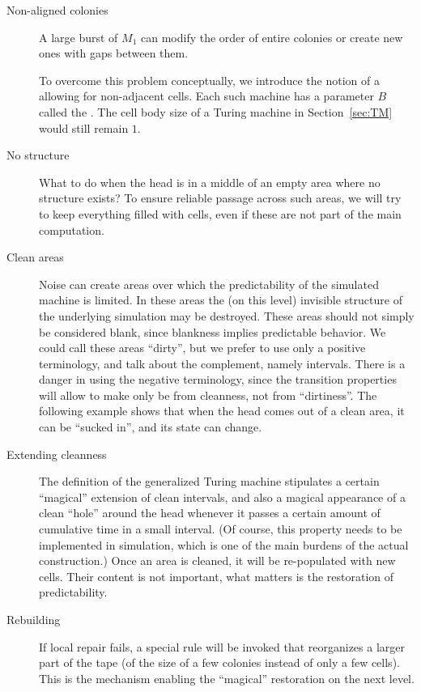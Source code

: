 \documentclass[12pt]{memoir}
\def\B{B}
\begin{document}
\begin{description}

\item[Non-aligned colonies] A large burst of \( M_{1} \) can modify the order of
entire colonies or create new ones with gaps between them.

To overcome this problem conceptually, we 
introduce the notion of a 
allowing for non-adjacent cells.
Each such machine has a parameter \( \B \) called the .
The cell body size of a Turing machine in Section~\ref{sec:TM} would still remain
\( 1 \).

    \item[No structure] What to do when the head is in a middle of an empty area
       where no structure exists?
To ensure reliable passage across such areas,
we will try to keep everything filled with cells, even if these are
not part of the main computation.

\item[Clean areas]
    Noise can create areas over
which the predictability of the simulated machine is limited.
In these areas the (on this level) invisible structure
of the underlying simulation may be destroyed.
These areas should not simply be considered blank, since
blankness implies predictable behavior.
We could call these areas ``dirty'', but we prefer to use only a positive terminology,
and talk about the complement, namely  intervals.
There is a danger in using the negative terminology, since the transition properties will allow
to make only be from cleanness, not from ``dirtiness''.
The following example shows that 
when the head comes out of a clean area, it can be
``sucked in'', and its state can change.


\item[Extending cleanness]
 The definition of the generalized
Turing machine stipulates a certain ``magical'' extension of clean intervals,
and also a magical appearance of a clean ``hole'' around the head 
whenever it passes a certain amount of cumulative time in a small interval.
(Of course, this property needs to be implemented in simulation, which is one of the
main burdens of the actual construction.)
Once an area is cleaned, it will be re-populated with new cells.
Their content is not important, what matters is the restoration of predictability.

\item[Rebuilding] If local repair fails, a special rule will be invoked that reorganizes a
larger part of the tape (of the size of a few colonies instead of only a few cells).
This is the mechanism enabling the ``magical'' restoration on the next level.

\end{description}
\end{document}
